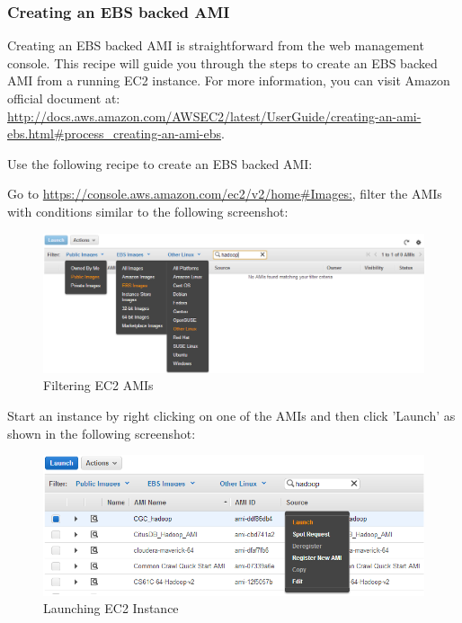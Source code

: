\subsubsection*{Creating an EBS backed AMI}
Creating an EBS backed AMI is straightforward from the web management console. This recipe will guide you through the steps to create an EBS backed AMI from a running EC2 instance. For more information, you can visit Amazon official document at: \url{http://docs.aws.amazon.com/AWSEC2/latest/UserGuide/creating-an-ami-ebs.html#process_creating-an-ami-ebs}.

Use the following recipe to create an EBS backed AMI:

Go to \url{https://console.aws.amazon.com/ec2/v2/home#Images:}, filter the AMIs with conditions similar to the following screenshot:
\begin{figure}[h]
  \centering
  \includegraphics[width=.8\textwidth]{figs/5163os_08_29.png}
  \caption{Filtering EC2 AMIs}\label{fig:aws.ec2.ami.filter}
\end{figure} 

Start an instance by right clicking on one of the AMIs and then click 'Launch' as shown in the following screenshot:
\begin{figure}[h]
  \centering
  \includegraphics[width=.8\textwidth]{figs/5163os_08_30.png}
  \caption{Launching EC2 Instance}\label{fig:aws.launch.instance}
\end{figure} 

